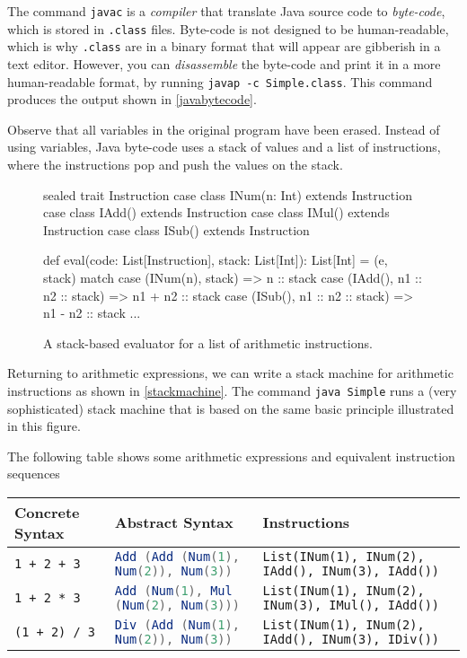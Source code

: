 The command \verb|javac| is a \emph{compiler} that translate Java source code to
\emph{byte-code}, which is stored in \verb|.class| files. Byte-code is not designed
to be human-readable, which is why \verb|.class| are in a binary format that will appear
are gibberish in a text editor. However, you can \emph{disassemble} the byte-code
and print it in a more human-readable format, by running \verb|javap -c Simple.class|.
This command produces the output shown in \cref{javabytecode}.

Observe that all variables in the original program
have been erased. Instead of using variables, Java byte-code uses a stack of values
and a list of instructions, where the instructions pop and push the values on the stack.

\begin{figure}
\begin{scalacode}
sealed trait Instruction
case class INum(n: Int) extends Instruction
case class IAdd() extends Instruction
case class IMul() extends Instruction
case class ISub() extends Instruction

def eval(code: List[Instruction], stack: List[Int]): List[Int] = (e, stack) match {
  case (INum(n), stack) => n :: stack
  case (IAdd(), n1 :: n2 :: stack) => n1 + n2 :: stack
  case (ISub(), n1 :: n2 :: stack) => n1 - n2 :: stack
  ...
}
\end{scalacode}
\caption{A stack-based evaluator for a list of arithmetic instructions.}
\end{figure}

Returning to arithmetic expressions, we can write a stack machine for arithmetic
instructions as shown in
\cref{stackmachine}. The command \verb|java Simple| runs
a (very sophisticated) stack machine that is based on the same basic principle illustrated
in this figure.

The following table shows some arithmetic expressions and equivalent 
instruction sequences

\begin{tabular}{l|l|l}
Concrete Syntax & Abstract Syntax & Instructions \\
\hline
\verb|1 + 2 + 3| & \lstinline[language=scala]|Add (Add (Num(1), Num(2)), Num(3))|
& \lstinline|List(INum(1), INum(2), IAdd(), INum(3), IAdd())| \\
\verb|1 + 2 * 3| & \lstinline[language=scala]|Add (Num(1), Mul (Num(2), Num(3)))|
& \lstinline|List(INum(1), INum(2), INum(3), IMul(), IAdd())| \\
\verb|(1 + 2) / 3| & \lstinline[language=scala]|Div (Add (Num(1), Num(2)), Num(3))|
& \lstinline|List(INum(1), INum(2), IAdd(), INum(3), IDiv())|
\end{tabular}

